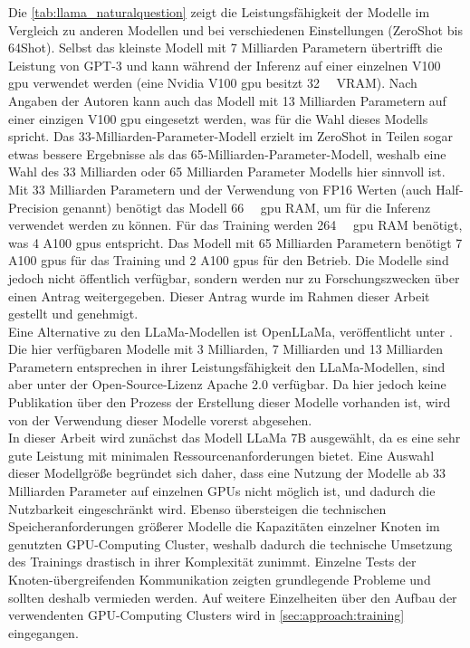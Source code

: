 Die \cref{tab:llama_naturalquestion} zeigt die Leistungsfähigkeit der Modelle im Vergleich zu anderen Modellen und bei verschiedenen Einstellungen (ZeroShot bis 64Shot).
Selbst das kleinste Modell mit 7 Milliarden Parametern übertrifft die Leistung von GPT-3 und kann während der Inferenz auf einer einzelnen V100 \ac{gpu} verwendet werden (eine Nvidia V100 \ac{gpu} besitzt \SI{32}{\giga\byte} VRAM).
Nach Angaben der Autoren kann auch das Modell mit 13 Milliarden Parametern auf einer einzigen V100 \ac{gpu} eingesetzt werden, was für die Wahl dieses Modells spricht.
Das 33-Milliarden-Parameter-Modell erzielt im ZeroShot in Teilen sogar etwas bessere Ergebnisse als das 65-Milliarden-Parameter-Modell, weshalb eine Wahl des 33 Milliarden oder 65 Milliarden Parameter Modells hier sinnvoll ist.
Mit 33 Milliarden Parametern und der Verwendung von FP16 Werten (auch Half-Precision genannt) benötigt das Modell \SI{66}{\giga\byte} \ac{gpu} RAM, um für die Inferenz verwendet werden zu können.
Für das Training werden \SI{264}{\giga\byte} \ac{gpu} RAM benötigt, was 4 A100 \ac{gpu}s entspricht.
Das Modell mit 65 Milliarden Parametern benötigt 7 A100 \ac{gpu}s für das Training und 2 A100 \ac{gpu}s für den Betrieb.
Die Modelle sind jedoch nicht öffentlich verfügbar, sondern werden nur zu Forschungszwecken über einen Antrag weitergegeben.
Dieser Antrag wurde im Rahmen dieser Arbeit gestellt und genehmigt.\\

Eine Alternative zu den LLaMa-Modellen ist OpenLLaMa, veröffentlicht unter \citet{openllama}.
Die hier verfügbaren Modelle mit 3 Milliarden, 7 Milliarden und 13 Milliarden Parametern entsprechen in ihrer Leistungsfähigkeit den LLaMa-Modellen, sind aber unter der Open-Source-Lizenz Apache 2.0 verfügbar. Da hier jedoch keine Publikation über den Prozess der Erstellung dieser Modelle vorhanden ist, wird von der Verwendung dieser Modelle vorerst abgesehen.\\

In dieser Arbeit wird zunächst das Modell LLaMa 7B ausgewählt, da es eine sehr gute Leistung mit minimalen Ressourcenanforderungen bietet.
Eine Auswahl dieser Modellgröße begründet sich daher, dass eine Nutzung der Modelle ab 33 Milliarden Parameter auf einzelnen GPUs nicht möglich ist, und dadurch die Nutzbarkeit eingeschränkt wird.
Ebenso übersteigen die technischen Speicheranforderungen größerer Modelle die Kapazitäten einzelner Knoten im genutzten GPU-Computing Cluster, weshalb dadurch die technische Umsetzung des Trainings drastisch in ihrer Komplexität zunimmt.
Einzelne Tests der Knoten-übergreifenden Kommunikation zeigten grundlegende Probleme und sollten deshalb vermieden werden.
Auf weitere Einzelheiten über den Aufbau der verwendenten GPU-Computing Clusters wird in \cref{sec:approach:training} eingegangen.\\

